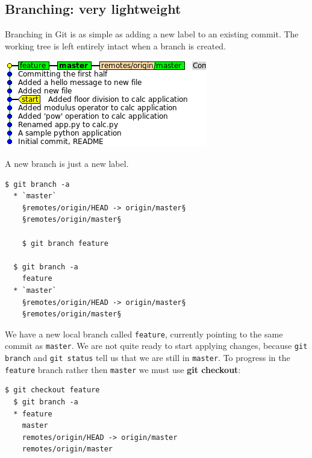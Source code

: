 \documentclass{../../common/tufte-latex/tufte-handout}
\begin{document}
\subsection{Branching: very lightweight}

Branching in Git is as simple as adding a new label to an existing commit.
The working tree is left entirely intact when a branch is created.
\begin{marginfigure}%
  \centering
  \includegraphics[width=\linewidth]{gitbranch-feature.png}
  \label{fig:gitbranch-feature}
  \caption{A new branch is just a new label.}
\end{marginfigure}
\begin{lstlisting}[style=BashInputStyle]
  $ git branch -a
  * `master`
    §remotes/origin/HEAD -> origin/master§
    §remotes/origin/master§

    $ git branch feature

  $ git branch -a
    feature
  * `master`
    §remotes/origin/HEAD -> origin/master§
    §remotes/origin/master§
\end{lstlisting}

We have a new local branch called \texttt{feature}, currently pointing to the same commit as \texttt{master}.
We are not quite ready to start applying changes, because \texttt{git branch} and \texttt{git status} tell us that we are still in \texttt{master}.
To progress in the \texttt{feature} branch rather then \texttt{master} we must use \textbf{git checkout}:

\begin{lstlisting}[style=BashInputStyle]
  $ git checkout feature
  $ git branch -a
  * feature
    master
    remotes/origin/HEAD -> origin/master
    remotes/origin/master
\end{lstlisting}
\end{document}
